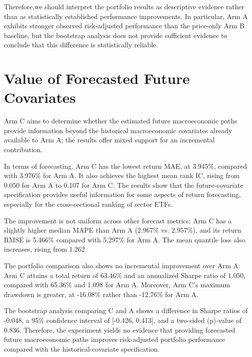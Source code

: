 \documentclass[12pt,a4paper,twoside,openany]{book}
\begin{document}
Therefore,we should interpret the portfolio results as descriptive
evidence rather than as statistically established performance
improvements. In particular, Arm A exhibits stronger observed
risk-adjusted performance than the price-only Arm B baseline, but the
bootstrap analysis does not provide sufficient evidence to conclude
that this difference is statistically reliable.

\section{Value of Forecasted Future Covariates}\label{value-of-forecasted-future-covariates}

Arm C aims to determine whether the estimated future macroeconomic paths provide information beyond the historical macroeconomic covariates already available to Arm A; the results offer mixed support for an incremental contribution.

In terms of forecasting, Arm C has the lowest return MAE, at 3.945\%, compared with 3.976\% for Arm A. It also achieves the highest mean rank IC, rising from 0.050 for Arm A to 0.107 for Arm C. The results show that the future-covariate specification provides useful information for some aspects of return forecasting, especially for the cross-sectional ranking of sector ETFs.

The improvement is not uniform across other forecast metrics; Arm C has a slightly higher median MAPE than Arm A (2.967\% vs. 2.957\%), and its return RMSE is 5.466\% compared with 5.297\% for Arm A. The mean quantile loss also increases, rising from 1.262%

The portfolio comparison also shows no incremental improvement over Arm A: Arm C attains a total return of 63.46\% and an annualized Sharpe ratio of 1.050, compared with 65.36\% and 1.098 for Arm A. Moreover, Arm C's maximum drawdown is greater, at -16.08\% rather than -12.76\% for Arm A.

The bootstrap analysis comparing C and A shows a difference in Sharpe ratios of -0.048, a 95\% confidence interval of [-0.426, 0.413], and a two-sided (p)-value of 0.836. Therefore, the experiment yields no evidence that providing forecasted future macroeconomic paths improves risk-adjusted portfolio performance compared with the historical-covariate specification.
\end{document}
